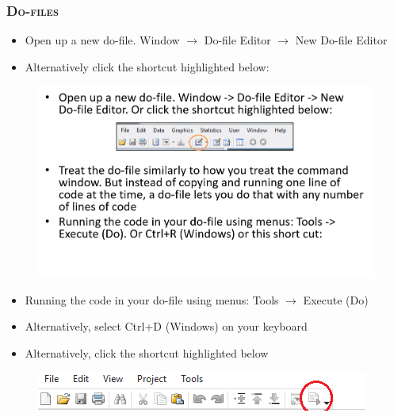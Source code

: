 \documentclass[10pt]{beamer}
\begin{document}
	\begin{frame}
		\frametitle{\textsc{Do-files}}
		\begin{itemize}
			\item Open up a new do-file. Window $\rightarrow$ Do-file Editor $\rightarrow$ New Do-file Editor
			\item Alternatively click the shortcut highlighted below:
		\end{itemize}
		\begin{figure}[H] 
			\centering
			\includegraphics[width=0.9\linewidth]{dofile}
		\end{figure}
	\end{frame}
	\begin{frame}
		\begin{itemize}
			\item Running the code in your do-file using menus: Tools $\rightarrow$ Execute (Do) 
			\item Alternatively, select Ctrl+D (Windows) on your keyboard
			\item Alternatively, click the shortcut highlighted below
		\end{itemize}
		\begin{figure}[H] 
			\centering
			\includegraphics[width=0.9\linewidth]{run}
		\end{figure}		
		
	\end{frame}
	
\end{document}

